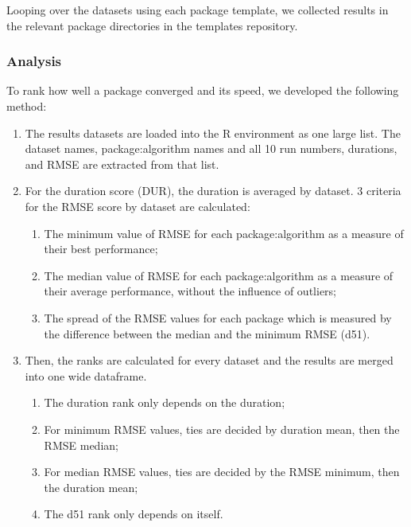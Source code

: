 Looping over the datasets using each package template, we collected
results in the relevant package directories in the templates repository.

\hypertarget{analysis}{%
\subsubsection{Analysis}\label{analysis}}

To rank how well a package converged and its speed, we developed the
following method:

\begin{enumerate}
\def\labelenumi{\arabic{enumi}.}
\tightlist
\item
  The results datasets are loaded into the R environment as one large
  list. The dataset names, package:algorithm names and all 10 run
  numbers, durations, and RMSE are extracted from that list.
\item
  For the duration score (DUR), the duration is averaged by dataset. 3
  criteria for the RMSE score by dataset are calculated:

  \begin{enumerate}
  \def\labelenumii{\alph{enumii}.}
  \tightlist
  \item
    The minimum value of RMSE for each package:algorithm as a measure of
    their best performance;
  \item
    The median value of RMSE for each package:algorithm as a measure of
    their average performance, without the influence of outliers;
  \item
    The spread of the RMSE values for each package which is measured by
    the difference between the median and the minimum RMSE (d51).
  \end{enumerate}
\item
  Then, the ranks are calculated for every dataset and the results are
  merged into one wide dataframe.

  \begin{enumerate}
  \def\labelenumii{\alph{enumii}.}
  \tightlist
  \item
    The duration rank only depends on the duration;
  \item
    For minimum RMSE values, ties are decided by duration mean, then the
    RMSE median;
  \item
    For median RMSE values, ties are decided by the RMSE minimum, then
    the duration mean;
  \item
    The d51 rank only depends on itself.
  \end{enumerate}
\end{enumerate}

